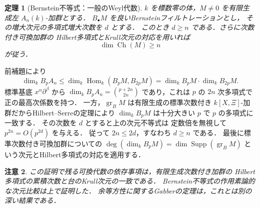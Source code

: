 \documentclass[a5paper,10pt,onecolumn]{jsarticle}
\makeatletter
\theoremstyle{mathnotetheorem}
\newtheorem{theorem}{定理}[section]
\newtheorem{remark}[theorem]{注意}
\renewcommand{\proofname}{証明}
\renewenvironment{proof}[1][\proofname]{%
  \par\pushQED{\qed}\normalfont\topsep4\p@\@plus2\p@\relax
  \trivlist\item[\hskip\labelsep\bfseries #1]\ignorespaces
}{\popQED\endtrivlist\@endpefalse}
\makeatother
\begin{document}
\begin{theorem}[Bernstein不等式：一般のWeyl代数]
$k$ を標数零の体，$M\ne0$ を有限生成左 $A_n(k)$-加群とする．
$B_\bullet M$ を良いBernsteinフィルトレーションとし，
その増大次元の多項式増大次数を $d$ とする．
このとき $d\ge n$ である．さらに次数付き可換加群の
Hilbert多項式とKrull次元の対応を用いれば
\[
 \dim\operatorname{Ch}(M)\ge n
\]
が従う．
\end{theorem}
\begin{proof}
前補題により
\[
 \dim_k B_pA_n
 \le\dim_k\operatorname{Hom}_k(B_pM,B_{2p}M)
 =\dim_k B_pM\cdot\dim_k B_{2p}M.
\]
標準基底 $x^\alpha\partial^\beta$ から
$\dim_kB_pA_n={p+2n\choose2n}$ であり，これは
$p$ の $2n$ 次多項式で正の最高次係数を持つ．
一方，$\operatorname{gr}_B M$ は有限生成の標準次数付き
$k[X,\Xi]$-加群だからHilbert--Serreの定理により
$\dim_kB_pM$ は十分大きい $p$ で $p$ の多項式に一致する．
その次数を $d$ とすると上の次元不等式は
定数倍を無視して $p^{2n}=O(p^{2d})$ を与える．
従って $2n\le2d$，すなわち $d\ge n$ である．
最後に標準次数付き可換加群についての
$\deg(\dim_kB_pM)=\dim\operatorname{Supp}(\operatorname{gr}_B M)$
という次元とHilbert多項式の対応を適用する．
\end{proof}
\begin{remark}
この証明で残る可換代数の依存事項は，有限生成次数付き加群の
Hilbert多項式の累積次数と台のKrull次元の一致である．
Bernstein不等式の作用素論的な次元比較は上で証明した．
余等方性に関するGabberの定理は，これとは別の深い結果である．
\end{remark}
\end{document}
